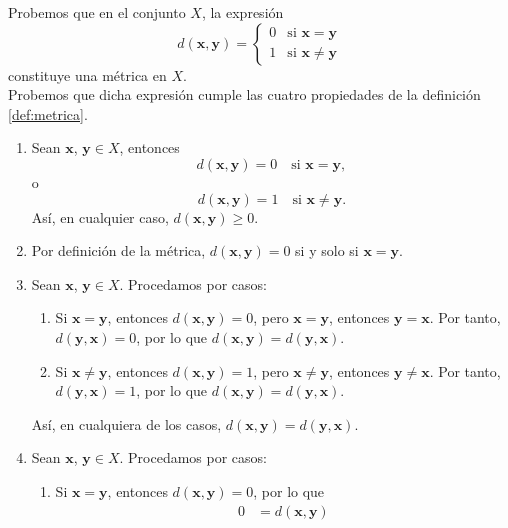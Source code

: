 \newpage

\begin{example}
    Probemos que en el conjunto $X$, la expresión
    $$d(\mathbf{x}, \mathbf{y}) = \begin{cases}
        0 & \text{si } \mathbf{x} = \mathbf{y} \\
        1 & \text{si } \mathbf{x} \neq \mathbf{y}
    \end{cases}$$
    constituye una métrica en $X$. \\
    \demostracion Probemos que dicha expresión cumple las cuatro propiedades de la definición \ref{def:metrica}.
    \begin{enumerate}[label=\roman*.]
        \item Sean $\mathbf{x}$, $\mathbf{y} \in X$, entonces
        $$d(\mathbf{x}, \mathbf{y}) = 0 \quad \text{si } \mathbf{x} = \mathbf{y},$$
        o
        $$d(\mathbf{x}, \mathbf{y}) = 1 \quad \text{si } \mathbf{x} \neq \mathbf{y}.$$
        Así, en cualquier caso, $d(\mathbf{x}, \mathbf{y}) \geq 0$.
        \item Por definición de la métrica, $d(\mathbf{x}, \mathbf{y}) = 0$ si y solo si $\mathbf{x} = \mathbf{y}$.
        \item Sean $\mathbf{x}$, $\mathbf{y} \in X$. Procedamos por casos:
        \begin{enumerate}
            \item Si $\mathbf{x} = \mathbf{y}$, entonces $d(\mathbf{x}, \mathbf{y}) = 0$, pero $\mathbf{x} = \mathbf{y}$, entonces $\mathbf{y} = \mathbf{x}$. Por tanto, $d(\mathbf{y}, \mathbf{x}) = 0$, por lo que $d(\mathbf{x}, \mathbf{y}) = d(\mathbf{y}, \mathbf{x})$.
            \item Si $\mathbf{x} \neq \mathbf{y}$, entonces $d(\mathbf{x}, \mathbf{y}) = 1$, pero $\mathbf{x} \neq \mathbf{y}$, entonces $\mathbf{y} \neq \mathbf{x}$. Por tanto, $d(\mathbf{y}, \mathbf{x}) = 1$, por lo que $d(\mathbf{x}, \mathbf{y}) = d(\mathbf{y}, \mathbf{x})$.
        \end{enumerate}
        Así, en cualquiera de los casos, $d(\mathbf{x}, \mathbf{y}) = d(\mathbf{y}, \mathbf{x})$.
        \item Sean $\mathbf{x}$, $\mathbf{y} \in X$. Procedamos por casos:
        \begin{enumerate}
            \item Si $\mathbf{x} = \mathbf{y}$, entonces $d(\mathbf{x}, \mathbf{y}) = 0$, por lo que
            \begin{align*}
                0 & = d(\mathbf{x}, \mathbf{y}) \\

\end{align*}
\end{enumerate}
\end{enumerate}
\end{example}
